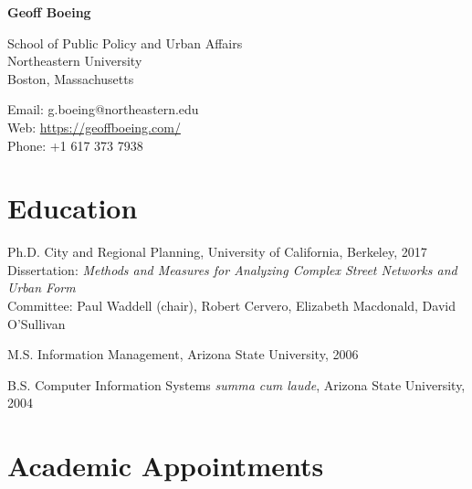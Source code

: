 \documentclass[12pt,letterpaper]{report}
\newcommand{\myname}{Geoff Boeing}
\newcommand{\namefont}[1]{{\normalfont\bfseries\Huge{#1}}}
\begin{document}
	\raggedright

	\namefont{\myname}

	\vspace{1em}
	\begin{minipage}[t]{0.495\textwidth}
		School of Public Policy and Urban Affairs \\
		Northeastern University \\
		Boston, Massachusetts
	\end{minipage}
	\begin{minipage}[t]{0.495\textwidth}
		Email: g.boeing@northeastern.edu \\
		Web: \href{https://geoffboeing.com/}{https://geoffboeing.com/} \\
		Phone: +1 617 373 7938
	\end{minipage}
	\vspace{0.5em}



	\section*{Education}

	\begin{tablist}

		\item[Ph.D.] \tab City and Regional Planning, University of California, Berkeley, 2017 \\
						  Dissertation: \textit{Methods and Measures for Analyzing Complex Street Networks and Urban Form} \\
						  Committee: Paul Waddell (chair), Robert Cervero, Elizabeth Macdonald, David O'Sullivan

		\item[M.S.]  \tab Information Management, Arizona State University, 2006

		\item[B.S.]  \tab Computer Information Systems \textit{summa cum laude}, Arizona State University, 2004

	\end{tablist}



	\section*{Academic Appointments}
\end{document}
